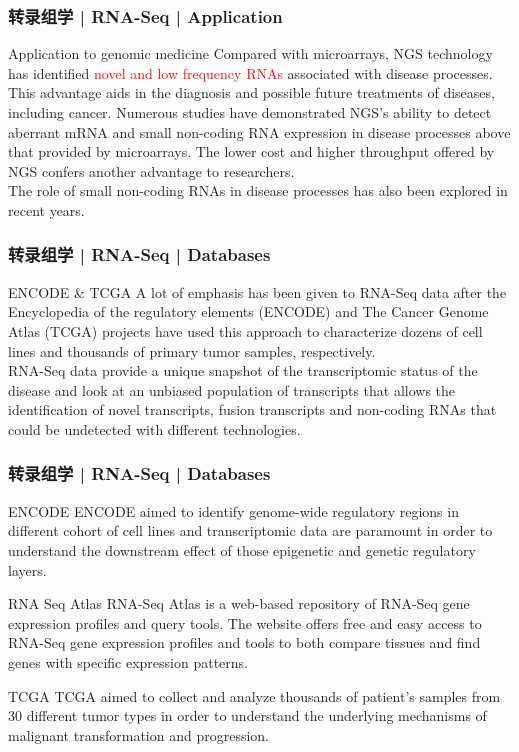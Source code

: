\begin{frame}
  \frametitle{转录组学 | RNA-Seq | Application}
  \begin{block}{Application to genomic medicine}
    Compared with microarrays, NGS technology has identified \textcolor{red}{novel and low frequency RNAs} associated with disease processes. This advantage aids in the diagnosis and possible future treatments of diseases, including cancer. Numerous studies have demonstrated NGS's ability to detect aberrant mRNA and small non-coding RNA expression in disease processes above that provided by microarrays. The lower cost and higher throughput offered by NGS confers another advantage to researchers.\\
  \vspace{1em}
  The role of small non-coding RNAs in disease processes has also been explored in recent years.
  \end{block}
\end{frame}

\begin{frame}
  \frametitle{转录组学 | RNA-Seq | Databases}
  \begin{block}{ENCODE \& TCGA}
 A lot of emphasis has been given to RNA-Seq data after the Encyclopedia of the regulatory elements (ENCODE) and The Cancer Genome Atlas (TCGA) projects have used this approach to characterize dozens of cell lines and thousands of primary tumor samples, respectively.\\
 \vspace{1em}
 RNA-Seq data provide a unique snapshot of the transcriptomic status of the disease and look at an unbiased population of transcripts that allows the identification of novel transcripts, fusion transcripts and non-coding RNAs that could be undetected with different technologies.
  \end{block}
\end{frame}

\begin{frame}
  \frametitle{转录组学 | RNA-Seq | Databases}
  {\footnotesize
  \begin{block}{ENCODE}
    ENCODE aimed to identify genome-wide regulatory regions in different cohort of cell lines and transcriptomic data are paramount in order to understand the downstream effect of those epigenetic and genetic regulatory layers.
  \end{block}
  \pause
  \begin{block}{RNA Seq Atlas}
    RNA-Seq Atlas is a web-based repository of RNA-Seq gene expression profiles and query tools. The website offers free and easy access to RNA-Seq gene expression profiles and tools to both compare tissues and find genes with specific expression patterns.
  \end{block}
  \pause
  \begin{block}{TCGA}
    TCGA aimed to collect and analyze thousands of patient's samples from 30 different tumor types in order to understand the underlying mechanisms of malignant transformation and progression.
  \end{block}
}
\end{frame}

